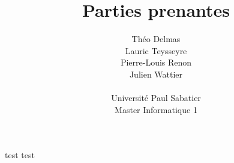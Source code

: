\documentclass[]{article}
\title{Parties prenantes}
\author{
    Théo Delmas\\
    Lauric Teysseyre\\
    Pierre-Louis Renon\\
    Julien Wattier\\
    \\
    Université Paul Sabatier\\
    Master Informatique 1\\
   }
\date{}
\begin{document}
    \maketitle
    \newpage
    \tableofcontents
    \newpage

   test test
\end{document}
